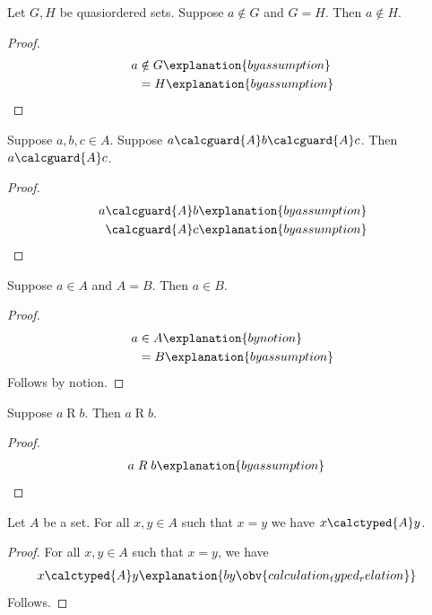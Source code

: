 \begin{proposition}\label{calculation_form_negative_carrier}
    Let $G,H$ be quasiordered sets. Suppose $a\notin G$ and $G=H$.
    Then $a\notin H$.
\end{proposition}
\begin{proof}
    \begin{align*}
        a
            &\notin G
                \explanation{by assumption}
                \\
            &= H
                \explanation{by assumption}
    \end{align*}
\end{proof}

\begin{proposition}\label{calculation_form_conditions}
    Suppose $a,b,c\in A$. Suppose $a\calcguard{A}b\calcguard{A}c$.
    Then $a\calcguard{A}c$.
\end{proposition}
\begin{proof}
    \begin{align*}
        a
            &\calcguard{A} b
                \explanation{by assumption}
                \\
            &\calcguard{A} c
                \explanation{by assumption}
    \end{align*}
\end{proof}

\begin{proposition}\label{calculation_form_notion_publication}
    Suppose $a\in A$ and $A=B$.
    Then $a\in B$.
\end{proposition}
\begin{proof}
    \begin{align*}
        a
            &\in A
                \explanation{by notion}
                \\
            &= B
                \explanation{by assumption}
    \end{align*}
    Follows by notion.
\end{proof}

\begin{proposition}\label{calculation_form_term_single}
    Suppose $a\mathrel{R}b$.
    Then $a\mathrel{R}b$.
\end{proposition}
\begin{proof}
    \begin{align*}
        a
            &\mathrel{R} b
                \explanation{by assumption}
    \end{align*}
\end{proof}

\begin{proposition}\label{calculation_prefix_formation}
    Let $A$ be a set.
    For all $x,y\in A$ such that $x=y$ we have $x\calctyped{A}y$.
\end{proposition}
\begin{proof}
    For all $x,y\in A$ such that $x=y$, we have
    \begin{align*}
        x
            &\calctyped{A}y
                \explanation{by \obv{calculation_typed_relation}}
    \end{align*}
    Follows.
\end{proof}
